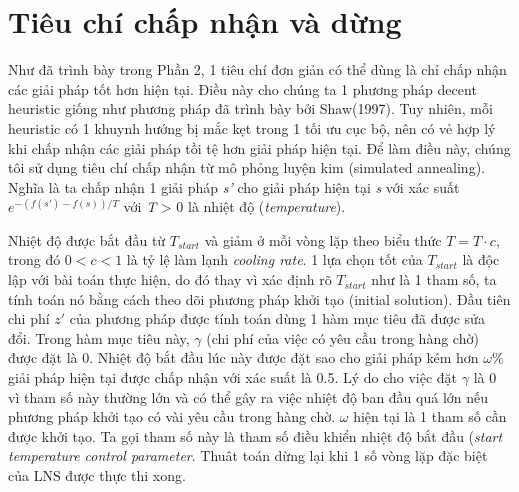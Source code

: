 \section{Tiêu chí chấp nhận và dừng}
Như đã trình bày trong Phần 2, 1 tiêu chí đơn giản có thể dùng là chỉ chấp nhận các giải pháp tốt hơn hiện tại. Điều này cho chúng ta 1 phương pháp decent heuristic giống như phương pháp đã trình bày bởi Shaw(1997). Tuy nhiên, mỗi heuristic có 1 khuynh hướng bị mắc kẹt trong 1 tối ưu cục bộ, nên có vẻ hợp lý khi chấp nhận các giải pháp tồi tệ hơn giải pháp hiện tại. Để làm điều này, chúng tôi sử dụng tiêu chí chấp nhận từ mô phỏng luyện kim (simulated annealing). Nghĩa là ta chấp nhận 1 giải pháp \textit{s'} cho giải pháp hiện tại \textit{s} với xác suất $e^{-(f(s')-f(s))/T}$ với \textit{T} > 0 là nhiệt độ (\textit{temperature}).

Nhiệt độ được bắt đầu từ $T_{start}$ và giảm ở mỗi vòng lặp theo biểu thức $T=T \cdot c$, trong đó $0<c<1$ là tỷ lệ làm lạnh \textit{cooling rate}. 1 lựa chọn tốt của $T_{start}$ là độc lập với bài toán thực hiện, do đó thay vì xác định rõ $T_{start}$ như là 1 tham số, ta tính toán nó bằng cách theo dõi phương pháp khởi tạo (initial solution). Đầu tiên chi phí $z'$ của phương pháp được tính toán dùng 1 hàm mục tiêu đã được sửa đổi. Trong hàm mục tiêu này, $\gamma$ (chi phí của việc có yêu cầu trong hàng chờ) được đặt là 0. Nhiệt độ bắt đầu lúc này được đặt sao cho giải pháp kém hơn $\omega\%$ giải pháp hiện tại được chấp nhận với xác suất là 0.5. Lý do cho việc đặt $\gamma$ là 0 vì tham số này thường lớn và có thể gây ra việc nhiệt độ ban đầu quá lớn nếu phương pháp khởi tạo có vài yêu cầu trong hàng chờ. $\omega$ hiện tại là 1 tham số cần được khởi tạo. Ta gọi tham số này là tham số điều khiển nhiệt độ bắt đầu (\textit{start temperature control parameter}. Thuât toán dừng lại khi 1 số vòng lặp đặc biệt của LNS được thực thi xong.
